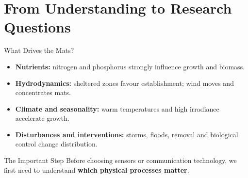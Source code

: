 \part[nopartpage]{From Understanding to Research Questions}

\begin{frame}{What Drives the Mats?}
\begin{itemize}
    \item \textbf{Nutrients:} nitrogen and phosphorus strongly influence growth and biomass.
    \item \textbf{Hydrodynamics:} sheltered zones favour establishment; wind moves and concentrates mats.
    \item \textbf{Climate and seasonality:} warm temperatures and high irradiance accelerate growth.
    \item \textbf{Disturbances and interventions:} storms, floods, removal and biological control change distribution.
\end{itemize}
\begin{block}{The Important Step}
Before choosing sensors or communication technology, we first need to understand \textbf{which physical processes matter}.
\end{block}
\end{frame}
